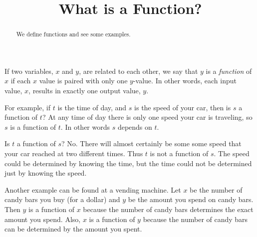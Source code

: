 \documentclass{ximera}
\title{What is a Function?}
\begin{document}
\begin{abstract}
We define functions and see some examples.
\end{abstract}
\maketitle


If two variables, $x$ and $y$, are related to each other, we say that $y$ is a \emph{function} of $x$ if each $x$ value is paired with only one $y$-value. In other words, each input value, $x$, results in exactly one output value, $y$.

For example, if $t$ is the time of day, and $s$ is the speed of your car, then is $s$ a function of $t$? At any time of day there is only one speed your car is traveling, so $s$ is a function of $t$. In other words $s$ depends on $t$.

Is $t$ a function of $s$? No. There will almost certainly be some some speed that your car reached at two different times. Thus $t$ is not a function of $s$. The speed could be determined by knowing the time, but the time could not be determined just by knowing the speed.

Another example can be found at a vending machine. Let $x$ be the number of candy bars you buy (for a dollar) and $y$ be the amount you spend on candy bars. Then $y$ is a function of $x$ because the number of candy bars determines the exact amount you spend. Also, $x$ is a function of $y$ because the number of candy bars can be determined by the amount you spent.
\end{document}
